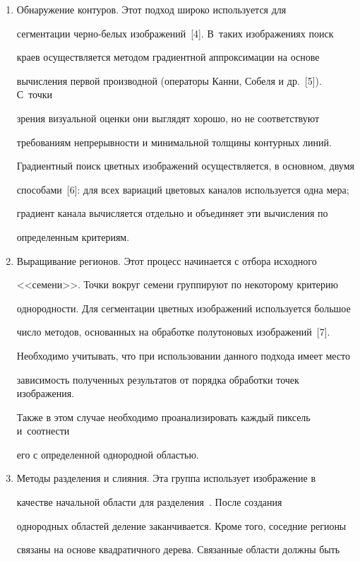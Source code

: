   \begin{enumerate}[1.]

  \item Обнаружение контуров. Этот подход широко используется для 

сегментации че\-рно-бе\-лых изображений~[4]. В~таких изображениях поиск 

краев осуществляется методом градиентной аппроксимации на основе 

вычисления первой производной (операторы Канни, Собеля и др.~[5]). С~точки 

зрения визуальной оценки они выглядят хорошо, но не соответствуют 

требованиям непрерывности и минимальной толщины контурных линий. 

  

  Градиентный поиск цветных изображений осуществляется, в основном, двумя 

способами~[6]: для всех вариаций цветовых каналов используется одна мера; 

градиент канала вычисляется отдельно и объединяет эти вычисления по 

определенным критериям.

  \item Выращивание регионов. Этот процесс начинается с отбора исходного 

<<семени>>. Точки вокруг семени группируют по некоторому критерию 

однородности. Для сегментации цветных изображений используется большое 

число методов, основанных на обработке полутоновых изображений~[7]. 

Необходимо учитывать, что при использовании данного подхода имеет место 

зависимость полученных результатов от порядка обработки точек изображения. 

Также в этом случае необходимо проанализировать каждый пиксель и~соотнести 

его с определенной однородной областью.

  \item Методы разделения и слияния. Эта группа использует изображение в 

качестве начальной области для разделения~\cite{3-sor}. После создания 

однородных областей деление заканчивается. Кроме того, соседние регионы 

связаны на основе квадратичного дерева. Связанные области должны быть 


\end{enumerate}
